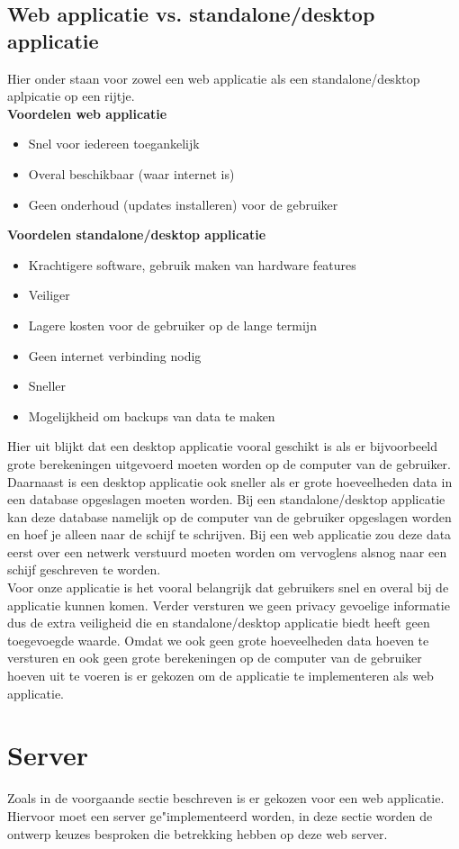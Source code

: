 \documentclass[twoside,openright]{uva-bachelor-thesis}
\begin{document}
		\subsection{Web applicatie vs. standalone/desktop applicatie}
			Hier onder staan voor zowel een web applicatie als een standalone/desktop aplpicatie op een rijtje.\\[0.5cm]
			\textbf{Voordelen web applicatie}
			\begin{itemize}
				\item Snel voor iedereen toegankelijk
				\item Overal beschikbaar (waar internet is)
				\item Geen onderhoud (updates installeren) voor de gebruiker
			\end{itemize}
			\textbf{Voordelen standalone/desktop applicatie}
			\begin{itemize}
				\item Krachtigere software, gebruik maken van hardware features
				\item Veiliger
				\item Lagere kosten voor de gebruiker op de lange termijn
				\item Geen internet verbinding nodig
				\item Sneller
				\item Mogelijkheid om backups van data te maken
			\end{itemize}
			Hier uit blijkt dat een desktop applicatie vooral geschikt is als er bijvoorbeeld grote berekeningen uitgevoerd moeten worden op de computer van de gebruiker. Daarnaast is een desktop applicatie ook sneller als er grote hoeveelheden data in een database opgeslagen moeten worden. Bij een standalone/desktop applicatie kan deze database namelijk op de computer van de gebruiker opgeslagen worden en hoef je alleen naar de schijf te schrijven. Bij een web applicatie zou deze data eerst over een netwerk verstuurd moeten worden om vervoglens alsnog naar een schijf geschreven te worden.\\[0.5cm]
			Voor onze applicatie is het vooral belangrijk dat gebruikers snel en overal bij de applicatie kunnen komen. Verder versturen we geen privacy gevoelige informatie dus de extra veiligheid die en standalone/desktop applicatie biedt heeft geen toegevoegde waarde. Omdat we ook geen grote hoeveelheden data hoeven te versturen en ook geen grote berekeningen op de computer van de gebruiker hoeven uit te voeren is er gekozen om de applicatie te implementeren als web applicatie.
	\section{Server}
		Zoals in de voorgaande sectie beschreven is er gekozen voor een web applicatie. Hiervoor moet een server ge"implementeerd worden, in deze sectie worden de ontwerp keuzes besproken die betrekking hebben op deze web server.
\end{document}
